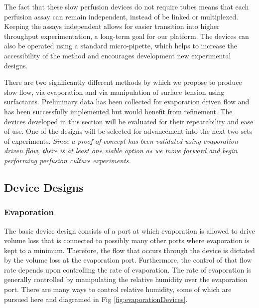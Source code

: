 The fact that these slow perfusion devices do not require tubes means that each perfusion assay can remain independent, instead of be linked or multiplexed. Keeping the assays independent allows for easier transition into higher throughput experimentation, a long-term goal for our platform. The devices can also be operated using a standard micro-pipette, which helps to increase the accessibility of the method and encourages development new experimental designs.

There are two significantly different methods by which we propose to produce slow flow, via evaporation and via manipulation of surface tension using surfactants. Preliminary data has been collected for evaporation driven flow and has been successfully implemented but would benefit from refinement. The devices developed in this section will be evaluated for their repeatability and ease of use. One of the designs will be selected for advancement into the next two sets of experiments. \emph{Since a proof-of-concept has been validated using evaporation driven flow, there is at least one viable option as we move forward and begin performing perfusion culture experiments.}

\subsection{Device Designs}\label{sec:deviceDesign}
\subsubsection{Evaporation}\label{sec:deviceDesignEvap}
The basic device design consists of a port at which evaporation is allowed to drive volume loss that is connected to possibly many other ports where evaporation is kept to a minimum. Therefore, the flow that occurs through the device is dictated by the volume loss at the evaporation port. Furthermore, the control of that flow rate depends upon controlling the rate of evaporation. The rate of evaporation is generally controlled by manipulating the relative humidity over the evaporation port. There are many ways to control relative humidity, some of which are pursued here and diagramed in Fig \ref{fig:evaporationDevices}.


